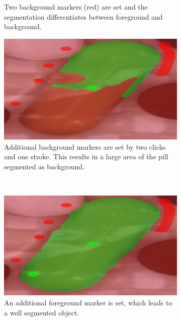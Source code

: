 \begin{figure}
\begin{subfigure}[t]{0.45\textwidth}
		\caption{
			Two background markers (red) are set and the segmentation differentiates between foreground and background.\\
		} \label{fig:ch3:sec3:application3}
	\end{subfigure}
	\hfill
	\begin{subfigure}[t]{0.45\textwidth}
		\centering
		\includegraphics[width=\textwidth]{figures/chap32_watershed_application4.png}
		\caption{
			Additional background markers are set by two clicks and one stroke. 
			This results in a large area of the pill segmented as background.
		} \label{fig:ch3:sec3:application4}
	\end{subfigure}
	\\
	\begin{subfigure}[t]{0.45\textwidth}
		\centering
		\includegraphics[width=\textwidth]{figures/chap32_watershed_application5.png}
		\caption{
			An additional foreground marker is set, which leads to a well segmented object.
		} \label{fig:ch3:sec3:application5}
	\end{subfigure}
	\hfill
	\begin{subfigure}[t]{0.45\textwidth}

\end{subfigure}
\end{figure}
